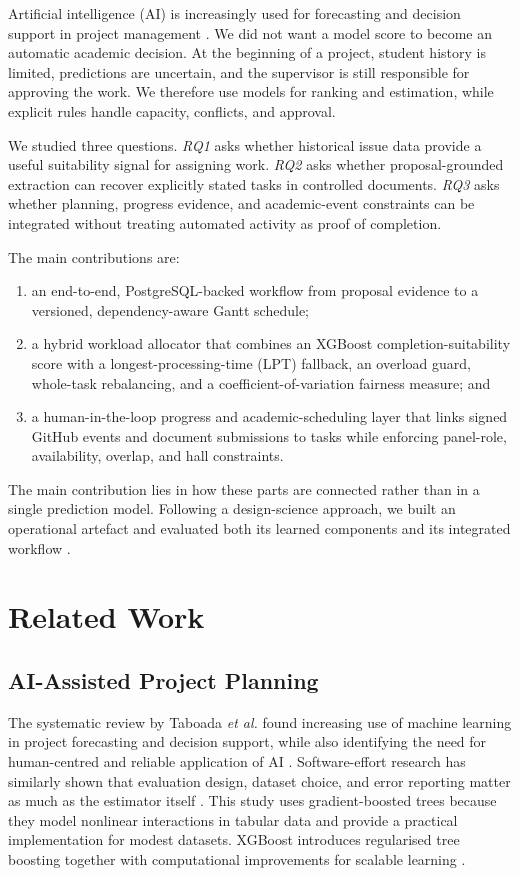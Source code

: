 \documentclass[conference]{IEEEtran}
\begin{document}
Artificial intelligence (AI) is increasingly used for forecasting and decision support in project management \cite{taboada2023ai}. We did not want a model score to become an automatic academic decision. At the beginning of a project, student history is limited, predictions are uncertain, and the supervisor is still responsible for approving the work. We therefore use models for ranking and estimation, while explicit rules handle capacity, conflicts, and approval.

We studied three questions. \emph{RQ1} asks whether historical issue data provide a useful suitability signal for assigning work. \emph{RQ2} asks whether proposal-grounded extraction can recover explicitly stated tasks in controlled documents. \emph{RQ3} asks whether planning, progress evidence, and academic-event constraints can be integrated without treating automated activity as proof of completion.

The main contributions are:
\begin{enumerate}
    \item an end-to-end, PostgreSQL-backed workflow from proposal evidence to a versioned, dependency-aware Gantt schedule;
    \item a hybrid workload allocator that combines an XGBoost completion-suitability score with a longest-processing-time (LPT) fallback, an overload guard, whole-task rebalancing, and a coefficient-of-variation fairness measure; and
    \item a human-in-the-loop progress and academic-scheduling layer that links signed GitHub events and document submissions to tasks while enforcing panel-role, availability, overlap, and hall constraints.
\end{enumerate}

The main contribution lies in how these parts are connected rather than in a single prediction model. Following a design-science approach, we built an operational artefact and evaluated both its learned components and its integrated workflow \cite{hevner2004designscience}.

\section{Related Work}

\subsection{AI-Assisted Project Planning}
The systematic review by Taboada \emph{et al.} found increasing use of machine learning in project forecasting and decision support, while also identifying the need for human-centred and reliable application of AI \cite{taboada2023ai}. Software-effort research has similarly shown that evaluation design, dataset choice, and error reporting matter as much as the estimator itself \cite{jorgensen2007systematic}. This study uses gradient-boosted trees because they model nonlinear interactions in tabular data and provide a practical implementation for modest datasets. XGBoost introduces regularised tree boosting together with computational improvements for scalable learning \cite{chen2016xgboost}.
\end{document}
